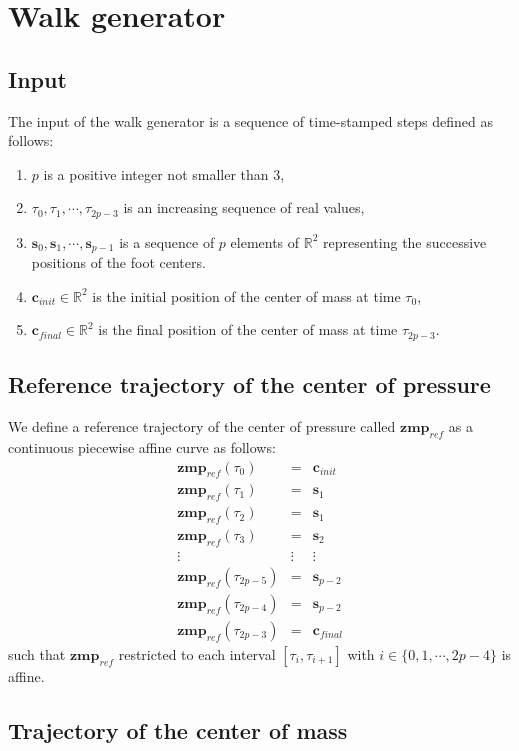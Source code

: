 \documentclass {article}
\newcommand\real{\mathbb{R}}
\newcommand\step{\mathbf{s}}
\newcommand\com{\mathbf{c}}
\newcommand\zmpref{\mathbf{zmp}_{ref}}
\begin{document}
\section {Walk generator}

\subsection {Input}

The input of the walk generator is a sequence of time-stamped steps defined
as follows:
\begin{enumerate}
\item $p$ is a positive integer not smaller than 3,
\item $\tau_0, \tau_1, \cdots, \tau_{2p-3}$ is an increasing sequence of real values,
\item $\step_0, \step_1, \cdots, \step_{p-1}$ is a sequence of $p$ elements of
  $\real^2$ representing the successive positions of the foot centers.
\item $\com_{init}\in\real^2$ is the initial position of the center of mass at
  time $\tau_0$,
\item $\com_{final}\in\real^2$ is the final position of the center of mass at time
  $\tau_{2p-3}$.
\end{enumerate}

\subsection {Reference trajectory of the center of pressure}

We define a reference trajectory of the center of pressure called
$\zmpref$ as a continuous piecewise affine curve as follows:
\begin{eqnarray*}
\zmpref (\tau_0) &=& \com_{init} \\
\zmpref (\tau_1) &=& \step_1 \\
\zmpref (\tau_2) &=& \step_1 \\
\zmpref (\tau_3) &=& \step_2 \\
\vdots & \vdots & \vdots \\
\zmpref (\tau_{2p-5}) &=& \step_{p-2} \\
\zmpref (\tau_{2p-4}) &=& \step_{p-2} \\
\zmpref (\tau_{2p-3}) &=& \com_{final}
\end{eqnarray*}
such that $\zmpref$ restricted to each interval $[\tau_i,\tau_{i+1}]$ with
$i\in\{0,1,\cdots,2p-4\}$ is affine.

\subsection {Trajectory of the center of mass}
\end{document}
